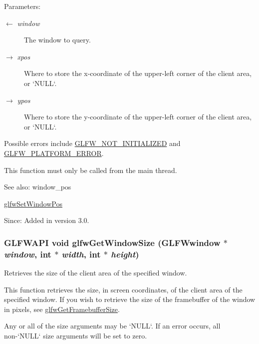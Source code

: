 \begin{Desc}
\item[Parameters:]
\begin{description}
\item[\mbox{$\leftarrow$} {\em window}]The window to query. \item[\mbox{$\rightarrow$} {\em xpos}]Where to store the x-coordinate of the upper-left corner of the client area, or `NULL`. \item[\mbox{$\rightarrow$} {\em ypos}]Where to store the y-coordinate of the upper-left corner of the client area, or `NULL`.\end{description}
\end{Desc}
Possible errors include \hyperlink{group__errors_g2374ee02c177f12e1fa76ff3ed15e14a}{GLFW\_\-NOT\_\-INITIALIZED} and \hyperlink{group__errors_gd44162d78100ea5e87cdd38426b8c7a1}{GLFW\_\-PLATFORM\_\-ERROR}.

This function must only be called from the main thread.

\begin{Desc}
\item[See also:]window\_\-pos 

\hyperlink{group__window_g0dc8d880a0d87be16d3ea8114561f6f0}{glfwSetWindowPos}\end{Desc}
\begin{Desc}
\item[Since:]Added in version 3.0. \end{Desc}
\hypertarget{group__window_g7feb769ebb3f3d21579b5a3fb07be76e}{
\subsubsection[glfwGetWindowSize]{\setlength{\rightskip}{0pt plus 5cm}GLFWAPI void glfwGetWindowSize ({\bf GLFWwindow} $\ast$ {\em window}, \/  int $\ast$ {\em width}, \/  int $\ast$ {\em height})}}
\label{group__window_g7feb769ebb3f3d21579b5a3fb07be76e}


Retrieves the size of the client area of the specified window. 

This function retrieves the size, in screen coordinates, of the client area of the specified window. If you wish to retrieve the size of the framebuffer of the window in pixels, see \hyperlink{group__window_gf7d17f3534b4b6dc9a6f905e3a240b7e}{glfwGetFramebufferSize}.

Any or all of the size arguments may be `NULL`. If an error occurs, all non-`NULL` size arguments will be set to zero.

